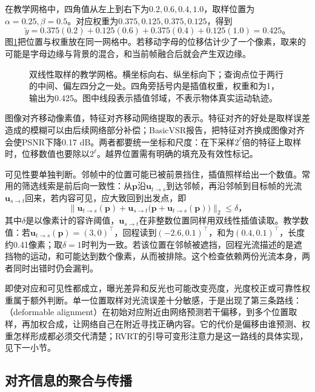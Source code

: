 在教学网格中，四角值从左上到右下为$0.2,0.6,0.4,1.0$，取样位置为$\alpha=0.25,\beta=0.5$。对应权重为$0.375,0.125,0.375,0.125$，得到
\[
  \widetilde y=0.375(0.2)+0.125(0.6)
       +0.375(0.4)+0.125(1.0)=0.425\text{。}
\]
图\ref{fig:vision-bilinear-warp}把位置与权重放在同一网格中。若移动字母的位移估计少了一个像素，取来的可能是字母边缘与背景的混合，和当前帧融合后就会产生双边缘。

\begin{figure}[htbp]
  \centering
  
  \caption{双线性取样的教学网格。横坐标向右、纵坐标向下；查询点位于两行的中间、偏左四分之一处。四角旁括号内是插值权重，权重和为1，输出为0.425。图中线段表示插值邻域，不表示物体真实运动轨迹。}
  \label{fig:vision-bilinear-warp}
\end{figure}

图像对齐移动像素值，特征对齐移动网络提取的表示。特征对齐的好处是取样误差造成的模糊可以由后续网络部分补偿；BasicVSR报告，把特征对齐换成图像对齐会使PSNR下降0.17 dB。两者都要统一坐标和尺度：在下采样$2^\ell$倍的特征上取样时，位移数值也要除以$2^\ell$。越界位置需有明确的填充及有效性标记。

可见性要单独判断。邻帧中的位置可能已被前景挡住，插值照样给出一个数值。常用的筛选线索是前后向一致性：从$\bm{p}$沿$\bm{u}_{t\to s}$到达邻帧，再沿邻帧到目标帧的光流$\bm{u}_{s\to t}$回来，若内容可见，应大致回到出发点，即
\begin{equation}
  \bigl\lVert\bm{u}_{t\to s}(\bm{p})
   +\bm{u}_{s\to t}\bigl(\bm{p}+\bm{u}_{t\to s}(\bm{p})\bigr)\bigr\rVert_2
  \leq\delta\text{，}
  \label{eq:vision-video-fb-consistency}
\end{equation}
其中$\delta$是以像素计的容许阈值，$\bm{u}_{s\to t}$在非整数位置同样用双线性插值读取。教学数值：若$\bm{u}_{t\to s}(\bm{p})=(3,0)^\top$，回程读到$(-2.6,0.1)^\top$，和为$(0.4,0.1)^\top$，长度约0.41像素；取$\delta=1$时判为一致。若该位置在邻帧被遮挡，回程光流描述的是遮挡物的运动，和可能达到数个像素，从而被排除。这个检查依赖两份光流本身，两者同时出错时仍会漏判。

即使对应和可见性都成立，曝光差异和反光也可能改变亮度，光度校正或可靠性权重属于额外判断。单一位置取样对光流误差十分敏感，于是出现了第三条路线：（deformable alignment）在初始对应附近由网络预测若干偏移，到多个位置取样，再加权合成，让网络自己在附近寻找正确内容。它的代价是偏移由谁预测、权重怎样形成都必须交代清楚；RVRT的引导可变形注意力是这一路线的具体实现，见下一小节。

\subsection{对齐信息的聚合与传播}
\label{sec:vision-video-fusion}
\label{sec:vision-video-rvrt}

